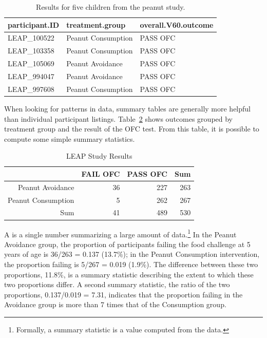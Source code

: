 \begin{table}[ht]
\centering
\begin{tabular}{lll}
  \hline
participant.ID & treatment.group & overall.V60.outcome \\ 
  \hline
LEAP\_100522 & Peanut Consumption & PASS OFC \\ 
  LEAP\_103358 & Peanut Consumption & PASS OFC \\ 
  LEAP\_105069 & Peanut Avoidance & PASS OFC \\ 
  LEAP\_994047 & Peanut Avoidance & PASS OFC \\ 
  LEAP\_997608 & Peanut Consumption & PASS OFC \\ 
   \hline
\end{tabular}
\caption{Results for five children from the peanut study.}
\label{leapStudyResultsDF}
\end{table}


When looking for patterns in data, summary tables are generally more helpful than individual participant listings. Table~\ref{leapStudyResults} shows outcomes grouped by treatment group and the result of the OFC test. From this table, it is possible to compute some simple summary statistics. 

\begin{table}[ht]
\centering
\begin{tabular}{rrrr}
  \hline
 & FAIL OFC & PASS OFC & Sum \\ 
  \hline
Peanut Avoidance & 36 & 227 & 263 \\ 
  Peanut Consumption & 5 & 262 & 267 \\ 
  Sum & 41 & 489 & 530 \\ 
   \hline
\end{tabular}
\caption{LEAP Study Results} 
\label{leapStudyResults}
\end{table}


A  is a single number summarizing a large amount of data.\footnote{Formally, a summary statistic is a value computed from the data.} In the Peanut Avoidance group, the proportion of participants failing the food challenge at 5 years of age is 36/263 = 0.137 (13.7\%); in the Peanut Consumption intervention, the proportion failing is 5/267 = 0.019 (1.9\%). The difference between these two proportions, 11.8\%, is a summary statistic describing the extent to which these two proportions differ. A second summary statistic, the ratio of the two proportions, 0.137/0.019 = 7.31, indicates that the proportion failing in the Avoidance group is more than 7 times that of the Consumption group.   
	
